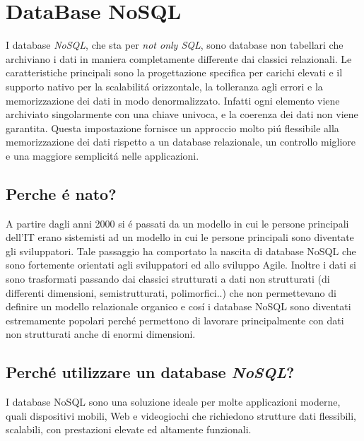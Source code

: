 \chapter{DataBase NoSQL}
I database \emph{NoSQL}, che sta per \emph{not only SQL}, sono database non tabellari che archiviano i dati
in maniera completamente differente dai classici relazionali.
Le caratteristiche principali sono la progettazione specifica per carichi elevati e il supporto nativo per la scalabilitá
orizzontale, la tolleranza agli errori e la memorizzazione dei dati in modo denormalizzato.
Infatti ogni elemento viene archiviato singolarmente con una chiave univoca, e la coerenza dei dati non viene garantita.
Questa impostazione fornisce un approccio molto piú flessibile alla memorizzazione dei dati rispetto a un database
relazionale, un controllo migliore e una maggiore semplicitá nelle applicazioni.

\section{Perche é nato?}
A partire dagli anni 2000 si é passati da un modello in cui le persone principali dell'IT erano sistemisti ad un modello
in cui le persone principali sono diventate gli sviluppatori. Tale passaggio ha comportato la nascita di database NoSQL
che sono fortemente orientati agli sviluppatori ed allo sviluppo Agile.
Inoltre i dati si sono trasformati passando dai classici strutturati a dati non strutturati (di differenti dimensioni,
semistrutturati, polimorfici..) che non permettevano di definire un modello relazionale organico e cosí i database NoSQL sono
diventati estremamente popolari perché permettono di lavorare principalmente con dati non strutturati anche di enormi
dimensioni.

\section{Perché utilizzare un database \emph{NoSQL}?}
I database NoSQL sono una soluzione ideale per molte applicazioni moderne, quali dispositivi mobili, Web e videogiochi
che richiedono strutture dati flessibili, scalabili, con prestazioni elevate ed altamente funzionali.
